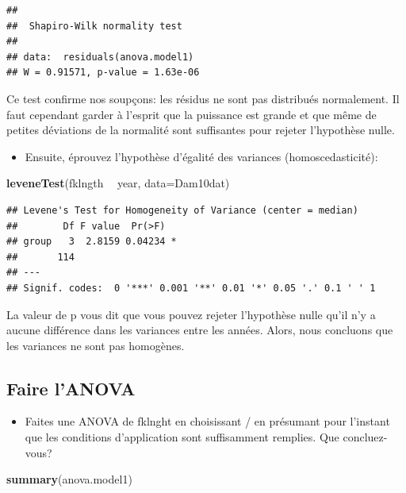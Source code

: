 \documentclass[12pt,]{book}
\newenvironment{Shaded}{\begin{snugshade}}{\end{snugshade}}
\newcommand{\DataTypeTok}[1]{\textcolor[rgb]{0.13,0.29,0.53}{#1}}
\newcommand{\KeywordTok}[1]{\textcolor[rgb]{0.13,0.29,0.53}{\textbf{#1}}}
\newcommand{\NormalTok}[1]{#1}
\newcommand{\OperatorTok}[1]{\textcolor[rgb]{0.81,0.36,0.00}{\textbf{#1}}}
\newcommand{\StringTok}[1]{\textcolor[rgb]{0.31,0.60,0.02}{#1}}
\providecommand{\tightlist}{%
  \setlength{\itemsep}{0pt}\setlength{\parskip}{0pt}}
\begin{document}
\begin{verbatim}
## 
##  Shapiro-Wilk normality test
## 
## data:  residuals(anova.model1)
## W = 0.91571, p-value = 1.63e-06
\end{verbatim}

Ce test confirme nos soupçons: les résidus ne sont pas distribués normalement. Il faut cependant garder à l'esprit que la puissance est grande et que même de petites déviations de la normalité sont suffisantes pour rejeter l'hypothèse nulle.

\begin{itemize}
\tightlist
\item
  Ensuite, éprouvez l'hypothèse d'égalité des variances (homoscedasticité):
\end{itemize}

\begin{Shaded}
\begin{Highlighting}[]
\KeywordTok{leveneTest}\NormalTok{(fklngth }\OperatorTok{~}\StringTok{ }\NormalTok{year, }\DataTypeTok{data=}\NormalTok{Dam10dat)}
\end{Highlighting}
\end{Shaded}

\begin{verbatim}
## Levene's Test for Homogeneity of Variance (center = median)
##        Df F value  Pr(>F)  
## group   3  2.8159 0.04234 *
##       114                  
## ---
## Signif. codes:  0 '***' 0.001 '**' 0.01 '*' 0.05 '.' 0.1 ' ' 1
\end{verbatim}

La valeur de p vous dit que vous pouvez rejeter l'hypothèse nulle qu'il n'y a aucune différence dans les variances entre les années. Alors, nous concluons que les variances ne sont pas homogènes.

\hypertarget{faire-lanova}{%
\subsection{Faire l'ANOVA}\label{faire-lanova}}

\begin{itemize}
\tightlist
\item
  Faites une ANOVA de fklnght en choisissant / en présumant pour l'instant que les conditions d'application sont suffisamment remplies. Que concluez-vous?
\end{itemize}

\begin{Shaded}
\begin{Highlighting}[]
\KeywordTok{summary}\NormalTok{(anova.model1)}
\end{Highlighting}
\end{Shaded}
\end{document}
